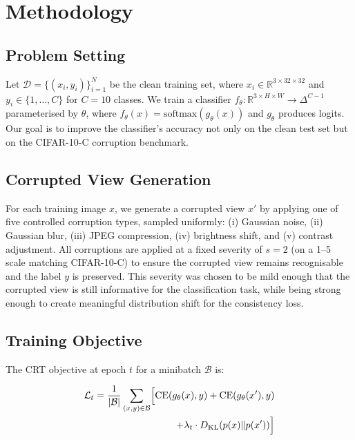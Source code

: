 \documentclass[10pt,twocolumn]{article}
\begin{document}
\section{Methodology}

\subsection{Problem Setting}

Let $\mathcal{D} = \{(x_i, y_i)\}_{i=1}^{N}$ be the clean training set, where $x_i \in \mathbb{R}^{3 \times 32 \times 32}$ and $y_i \in \{1, \ldots, C\}$ for $C=10$ classes. We train a classifier $f_\theta : \mathbb{R}^{3 \times H \times W} \to \Delta^{C-1}$ parameterised by $\theta$, where $f_\theta(x) = \mathrm{softmax}(g_\theta(x))$ and $g_\theta$ produces logits. Our goal is to improve the classifier's accuracy not only on the clean test set but on the CIFAR-10-C corruption benchmark.

\subsection{Corrupted View Generation}

For each training image $x$, we generate a corrupted view $x'$ by applying one of five controlled corruption types, sampled uniformly: (i) Gaussian noise, (ii) Gaussian blur, (iii) JPEG compression, (iv) brightness shift, and (v) contrast adjustment. All corruptions are applied at a fixed severity of $s=2$ (on a 1--5 scale matching CIFAR-10-C) to ensure the corrupted view remains recognisable and the label $y$ is preserved. This severity was chosen to be mild enough that the corrupted view is still informative for the classification task, while being strong enough to create meaningful distribution shift for the consistency loss.

\subsection{Training Objective}

The CRT objective at epoch $t$ for a minibatch $\mathcal{B}$ is:

\begin{equation}
\begin{aligned}
\mathcal{L}_t = \frac{1}{|\mathcal{B}|} \sum_{(x,y) \in \mathcal{B}} \Bigl[ 
\mathrm{CE}(g_\theta(x), y) + \mathrm{CE}(g_\theta(x'), y) \\
+ \lambda_t \cdot D_{\mathrm{KL}}(p(x) \| p(x')) 
\Bigr]
\end{aligned}
\label{eq:full_loss}
\end{equation}
\end{document}

